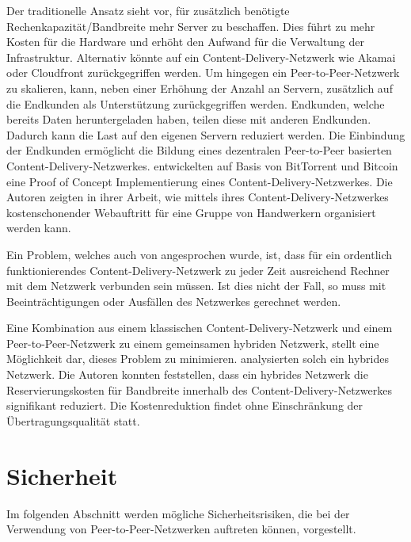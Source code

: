  Der traditionelle Ansatz sieht vor, für zusätzlich benötigte Rechenkapazität/Bandbreite mehr Server zu beschaffen. Dies führt zu mehr Kosten für die Hardware und erhöht den Aufwand für die Verwaltung der Infrastruktur. Alternativ könnte auf ein Content-Delivery-Netzwerk wie Akamai oder Cloudfront zurückgegriffen werden. Um hingegen ein Peer-to-Peer-Netzwerk zu skalieren, kann, neben einer Erhöhung der Anzahl an Servern, zusätzlich auf die Endkunden als Unterstützung zurückgegriffen werden. Endkunden, welche bereits Daten heruntergeladen haben, teilen diese mit anderen Endkunden. Dadurch kann die Last auf den eigenen Servern reduziert werden. Die Einbindung der Endkunden ermöglicht die Bildung eines dezentralen Peer-to-Peer basierten Content-Delivery-Netzwerkes. \textcite{migliardi2015feasibility} entwickelten auf Basis von BitTorrent und Bitcoin eine Proof of Concept Implementierung eines Content-Delivery-Netzwerkes. Die Autoren zeigten in ihrer Arbeit, wie mittels ihres Content-Delivery-Netzwerkes kostenschonender Webauftritt für eine Gruppe von Handwerkern organisiert werden kann. 

 Ein Problem, welches auch von \textcite{migliardi2015feasibility} angesprochen wurde, ist, dass für ein ordentlich funktionierendes Content-Delivery-Netzwerk zu jeder Zeit ausreichend Rechner mit dem Netzwerk verbunden sein müssen. Ist dies nicht der Fall, so muss mit Beeinträchtigungen oder Ausfällen des Netzwerkes gerechnet werden. 

 Eine Kombination aus einem klassischen Content-Delivery-Netzwerk und einem Peer-to-Peer-Netzwerk zu einem gemeinsamen hybriden Netzwerk, stellt eine Möglichkeit dar, dieses Problem zu minimieren. \textcite{xu2006analysis} analysierten solch ein hybrides Netzwerk. Die Autoren konnten feststellen, dass ein hybrides Netzwerk die Reservierungskosten für Bandbreite innerhalb des Content-Delivery-Netzwerkes signifikant reduziert. Die Kostenreduktion findet ohne Einschränkung der Übertragungsqualität statt.

\section{Sicherheit}

Im folgenden Abschnitt werden mögliche Sicherheitsrisiken, die bei der Verwendung von Peer-to-Peer-Netzwerken auftreten können, vorgestellt. 

